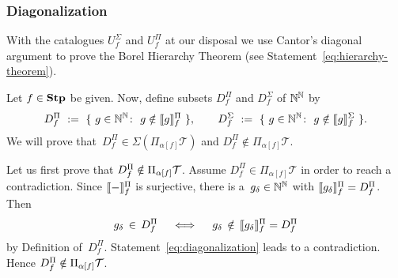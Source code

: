 \documentclass[main.tex]{subfiles}
\begin{document}
\subsubsection{Diagonalization}$\,$\\
With the catalogues $U^\Sigma_f$ and $U^\Pi_f$
at our disposal
we use Cantor's diagonal argument
to prove the Borel Hierarchy Theorem
(see Statement~\eqref{eq:hierarchy-theorem}).

Let $f\in\mathbf{Stp}$ be given.
Now, define subsets $D^\Pi_f$
and $D^\Sigma_f$ of $\mathbb{N}^{\mathbb{N}}$ by
\begin{equation*}
D^\Pi_f \ \eqdf \ 
\{\  g\in\N^\N\colon\ g\notin \decode{g}^\Pi_f\ \},
\qquad
D^\Sigma_f \ \eqdf \ 
\{\  g\in\N^\N\colon\ g\notin \decode{g}^\Sigma_f\ \}.
\end{equation*}
We will prove that~$D^\Pi_f \in \Sigma(\Pi_{\alpha[f]}\mathcal{T})$
and $D^\Pi_f\notin \Pi_{\alpha[f]}\mathcal{T}$.

Let us first prove that $D^\Pi_f\notin \smash{\Pi_{\alpha[f]}} \mathcal{T}$.
Assume $D^\Pi_f \in \Pi_{\alpha[f]}\mathcal{T}$
in order to reach a contradiction.
Since $\decode{-}^\Pi_f$
is surjective,
there is a~$g_\delta \in \mathbb{N}^{\mathbb{N}}$
with $\decode{g_\delta}^\Pi_f = D^\Pi_f$.
Then
\begin{equation}
\label{eq:diagonalization}
g_\delta \,\in\, D^\Pi_f
\quad\iff\quad
g_\delta \,\notin\, \decode{g_\delta}^\Pi_f = D^\Pi_f
\end{equation}
by Definition of~$D^\Pi_f$.
Statement~\eqref{eq:diagonalization}
leads to a contradiction.
Hence $D^\Pi_f\notin \smash{\Pi_{\alpha[f]}} \mathcal{T}$.
\end{document}
